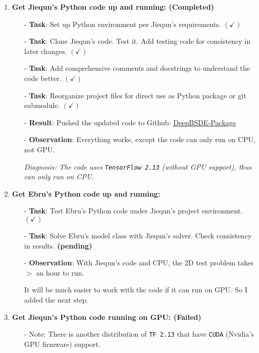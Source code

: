 \documentclass[10pt]{article}
\begin{document}
\begin{enumerate}
    \item \textbf{Get Jiequn's Python code up and running: (Completed)}
        \begin{enumerate}
            \item[-] \textbf{Task}: Set up Python environment per Jiequn's requirements. $(\checkmark)$
            \item[-] \textbf{Task}: Clone Jiequn's code. Test it. Add testing code for consistency in later changes. $(\checkmark)$
            \item[-] \textbf{Task}: Add comprehensive comments and docstrings to understand the code better. $(\checkmark)$
            \item[-] \textbf{Task}: Reorganize project files for direct use as Python package or git submodule. $(\checkmark)$
            \item[-] \textbf{Result}: Pushed the updated code to Github: \href{https://github.com/Steve-Shao/DeepBSDE-Package}{DeepBSDE-Package}
            \item[-] \textbf{Observation}: Everything works, except {\color{red}the code can only run on CPU, not GPU}. 
            \item[] \emph{Diagnosis: The code uses \texttt{TensorFlow 2.13} (without GPU support), thus can only run on CPU.}
        \end{enumerate}
    \item \textbf{Get Ebru's Python code up and running:}
    \begin{enumerate}
        \item[-] \textbf{Task}: Test Ebru's Python code under Jiequn's project environment. $(\checkmark)$
        \item[-] \textbf{Task}: Solve Ebru's model class with Jiequn's solver. Check consistency in results. \textbf{\color{red}(pending)}
        \item[-] \textbf{Observation}: With Jiequn's code and CPU, the 2D test problem takes $>$ an hour to run. 
        \item[] It will be much easier to work with the code if it can run on GPU. So I added the next step. 
    \end{enumerate}
    \item \textbf{Get Jiequn's Python code running on GPU: (Failed)}
    \begin{enumerate}
        \item[-] Note: There is another distribution of \texttt{TF 2.13} that have \texttt{CUDA} (Nvidia's GPU firmware) support.

\end{enumerate}
\end{enumerate}
\end{document}
